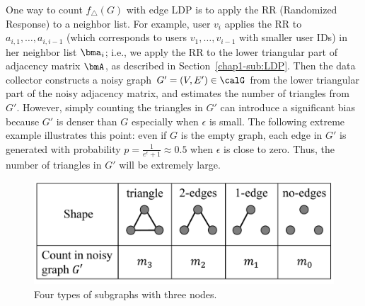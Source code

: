 One way to count $f_\triangle(G)$ with edge LDP is 
to apply the RR (Randomized Response) 
to a neighbor list. 
For example, user $v_i$ applies the RR to 
$a_{i,1}, \ldots, a_{i,i-1}$ (which corresponds to users $v_1, \ldots, v_{i-1}$ with smaller user IDs) in her neighbor list $\bma_i$; i.e., 
we apply the RR to the lower triangular part of adjacency matrix $\bmA$, as described in Section~\ref{chap1-sub:LDP}. 
Then the data collector constructs a noisy graph $G'=(V,E') \in \calG$ from the lower triangular part of the noisy adjacency matrix, and 
estimates the number of triangles 
from $G'$. 
However, 
simply counting
the triangles in 
$G'$ 
can introduce a significant bias 
because $G'$ is denser than $G$ especially when $\epsilon$ is small. 
The following extreme example illustrates this point: 
even if $G$ is the empty graph, 
each edge in $G'$ is generated with probability $p = \frac{1}{e^\epsilon+1} \approx 0.5$ when $\epsilon$ is close to zero. 
Thus, the 
number of triangles in 
$G'$ 
will be extremely large. 

\begin{figure}
\centering
\includegraphics[width=0.9\linewidth]{fig/triplet_shape.pdf}

\caption{Four types of subgraphs with three nodes.}
\label{chap1-fig:triplet_shape}
\end{figure}

